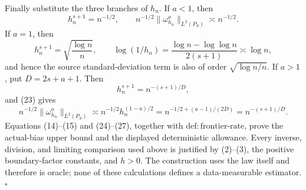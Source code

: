Finally substitute the three branches of \(h_n\). If \(a<1\), then
\[
h_n^{s+1}=n^{-1/2},
\qquad n^{-1/2}\|\omega_{h_n}^o\|_{L^2(P_S)}\asymp n^{-1/2}.
\tag{24}
\]
If \(a=1\), then
\[
h_n^{s+1}=\sqrt{\frac{\log n}{n}},
\qquad
\log(1/h_n)=\frac{\log n-\log\log n}{2(s+1)}\asymp\log n,
\tag{25}
\]
and hence the source standard-deviation term is also of order
\(\sqrt{\log n/n}\). If \(a>1\), put \(D=2s+a+1\). Then
\[
h_n^{s+1}=n^{-(s+1)/D},
\tag{26}
\]
and (23) gives
\[
n^{-1/2}\|\omega_{h_n}^o\|_{L^2(P_S)}
\asymp n^{-1/2}h_n^{(1-a)/2}
=n^{-1/2+(a-1)/(2D)}
=n^{-(s+1)/D}.
\tag{27}
\]
Equations (14)--(15) and (24)--(27), together with
\(\mathrm{def:frontier\text{-}rate}\), prove the actual-bias upper bound and the displayed deterministic allowance. Every inverse, division, and limiting comparison used above is justified by (2)--(3), the positive boundary-factor constants, and \(h>0\). The construction uses the law itself and therefore is oracle; none of these calculations defines a data-measurable estimator. \(\square\)